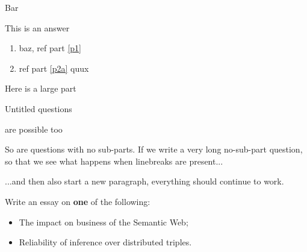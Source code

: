 \documentclass{gsexam}
\begin{document}
\begin{bscexam}

\subject{Computer Science}

\coverpage

\begin{question}{25}
\item \label{p1} Bar 
\begin{answer}
This is an answer
\end{answer}
\item 
  \begin{enumerate}
  \item \label{p2a} baz, ref part \ref{p1}
  \item ref part \ref{p2a} quux
  \end{enumerate}
\end{question}
\clearpage
\begin{question}{2}
\item \label{p2} Here is a large part
\end{question}
\clearpage
\begin{question}{24}
\item Untitled questions 
\item are possible too 
\end{question}
\clearpage
\begin{question}{17}
  So are questions with no sub-parts.  If we write a very long
  no-sub-part question, so that we see what happens when linebreaks
  are present... 

  ...and then also start a new paragraph, everything should continue to
  work.  
\end{question}
\clearpage
\begin{question}{24}
  \item Write an essay on \textbf{one} of the following:
    \begin{itemize}
    \item The impact on business of the Semantic Web;
    \item Reliability of inference over distributed triples.
    \end{itemize}
  \end{question}

\end{bscexam}
\end{document}
